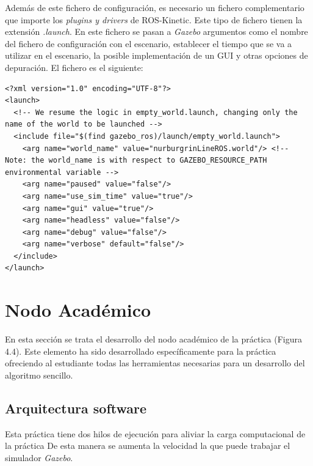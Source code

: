 Además de este fichero de configuración, es necesario un fichero complementario que importe los \textit{plugins y drivers} de ROS-Kinetic. Este tipo de fichero tienen la extensión \textit{.launch}. En este fichero se pasan a \textit{Gazebo} argumentos como el nombre del fichero de configuración con el escenario, establecer el tiempo que se va a utilizar en el escenario, la posible implementación de un GUI y otras opciones de depuración.
El fichero es el siguiente:

\lstset{language=XML, breaklines=true, basicstyle=\footnotesize}
\begin{lstlisting}[frame=single]
<?xml version="1.0" encoding="UTF-8"?>
<launch>
  <!-- We resume the logic in empty_world.launch, changing only the name of the world to be launched -->
  <include file="$(find gazebo_ros)/launch/empty_world.launch">
    <arg name="world_name" value="nurburgrinLineROS.world"/> <!-- Note: the world_name is with respect to GAZEBO_RESOURCE_PATH environmental variable -->
    <arg name="paused" value="false"/>
    <arg name="use_sim_time" value="true"/>
    <arg name="gui" value="true"/>
    <arg name="headless" value="false"/>
    <arg name="debug" value="false"/>
    <arg name="verbose" default="false"/>
  </include>
</launch>
\end{lstlisting}

\section{Nodo Académico}
En esta sección se trata el desarrollo del nodo académico de la práctica (Figura 4.4). Este elemento ha sido desarrollado específicamente para la práctica ofreciendo al estudiante todas las herramientas necesarias para un desarrollo del algoritmo sencillo.


\subsection{Arquitectura software}
Esta práctica tiene dos hilos de ejecución para aliviar la carga computacional de la práctica De esta manera se aumenta la velocidad  la que puede trabajar el simulador \textit{Gazebo}.

